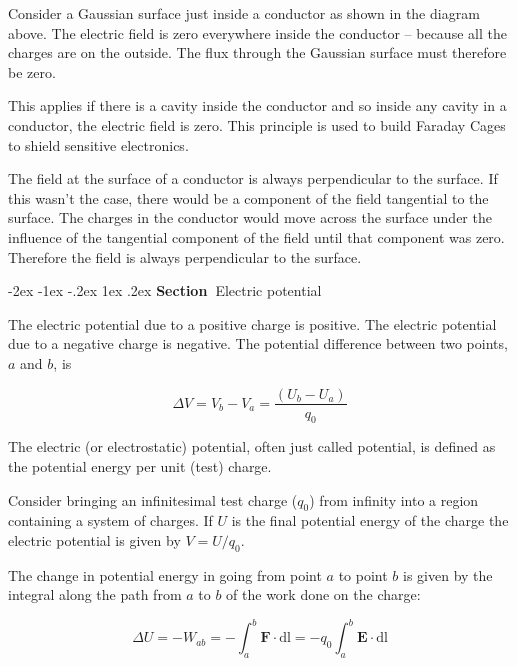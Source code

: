 \documentclass[
]{book}
\makeatletter
\renewcommand\section{%
\@startsection{section}{1}{\z@}%
              {-2ex \@plus -1ex \@minus -.2ex}%
              {1ex \@plus .2ex}%
              {\sffamily\bfseries\large\noindent Section~}}
\numberwithin{equation}{section}
\makeatother
\begin{document}
Consider a Gaussian surface just inside a conductor as shown in the diagram above. The
electric field is zero everywhere inside the conductor -- because all
the charges are on the outside. The flux through the Gaussian surface
must therefore be zero.

This applies if there is a cavity inside the conductor and so inside any
cavity in a conductor, the electric field is zero. This principle is
used to build Faraday Cages to shield sensitive electronics.

The field at the surface of a conductor is always perpendicular to the
surface. If this wasn't the case, there would be a component of the
field tangential to the surface. The charges in the conductor would move
across the surface under the influence of the tangential component of
the field until that component was zero. Therefore the field is always
perpendicular to the surface.

\hypertarget{electric-potential}{%
\section{Electric potential}\label{electric-potential}}

The electric potential due to a positive charge is positive. The
electric potential due to a negative charge is negative. The potential
difference between two points, \(a\) and \(b\), is

\begin{equation}
\label{eq:DeltaV}
\Delta V = V_b - V_a =\frac{(U_b - U_a)}{q_0}   
\end{equation}

The electric (or electrostatic) potential, often just called potential,
is defined as the potential energy per unit (test) charge.

Consider bringing an infinitesimal test charge (\(q_0\)) from infinity
into a region containing a system of charges. If \(U\) is the final
potential energy of the charge the electric potential is given by
\(V = U/q_0\).

The change in potential energy in going from point \(a\) to point \(b\) is
given by the integral along the path from \(a\) to \(b\) of the work done on
the charge:

\begin{equation}
\label{eq:DeltaU}
\Delta U = - W_{ab} = -\int_a^b \mathbf{F} \cdot \mathrm{d}\mathrm{l} = -q_0 \int_a^b \mathbf{E} \cdot \mathrm{d}\mathrm{l}
\end{equation}
\end{document}
